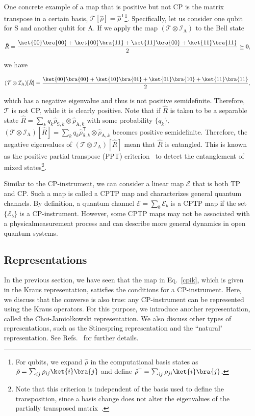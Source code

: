 \documentclass[preprint,pteplogo]{ptephy_v2}%
\numberwithin{equation}{section}
\theoremstyle{definition}
\newcommand{\ml}[1]{\mathcal{#1}}
\newcommand{\mr}[1]{\mathrm{#1}}
\newcommand{\aln}[1]{
\begin{align}
#1
\end{align}
}
\begin{document}
One concrete example of a map that is positive but not CP is the matrix transpose in a certain basis, $\ml{T}[\hat{\rho}]=\hat{\rho}^\mathsf{T}$\footnote{
For qubits, we expand $\hat{\rho}$ in the computational basis states as $\hat{\rho}=\sum_{ij} \rho_{ij}\ket{i}\bra{j}$ and define $\hat{\rho}^\mathsf{T}=\sum_{ij} \rho_{ji}\ket{i}\bra{j}$.
}.
Specifically, let us consider one qubit for S and another qubit for A.
If we apply the map $(\ml{T}\otimes \ml{I}_\mr{A})$ to the Bell state 
\aln{
\hat{R}=\frac{\ket{00}\bra{00}+\ket{00}\bra{11}+\ket{11}\bra{00}+\ket{11}\bra{11}}{2}\succeq 0,
}
we have
\aln{
(\ml{T}\otimes \ml{I}_\mr{A})[\hat{R}]=\frac{\ket{00}\bra{00}+\ket{10}\bra{01}+\ket{01}\bra{10}+\ket{11}\bra{11}}{2},
}
which has a negative eigenvalue and thus is not positive semidefinite.
Therefore, $\ml{T}$ is not CP, while it is clearly positive.
Note that if $\hat{R}$ is taken to be a separable state $\hat{R}=\sum_k q_k\hat{\rho}_{\mr{S},k}\otimes \hat{\rho}_{\mr{A},k}$ with some probability $\{q_k\}$, $(\ml{T}\otimes \ml{I}_\mr{A})[\hat{R}]=\sum_k q_k\hat{\rho}_{\mr{S},k}^\mathsf{T}\otimes \hat{\rho}_{\mr{A},k}$ becomes positive semidefinite.
Therefore, the negative eigenvalues of $(\ml{T}\otimes \ml{I}_\mr{A})[\hat{R}]$ mean that $\hat{R}$ is entangled. 
This is known as the positive partial transpose (PPT) criterion~\cite{peres1996separability, horodecki2001separability} to detect the entanglement of mixed states\footnote{
Note that this criterion is independent of the basis used to define the transposition, since a basis change does not alter the eigenvalues of the partially transposed matrix~\cite{wolf2012quantum}.
}.

Similar to the CP-instrument, we can consider a linear map $\ml{E}$ that is both TP and CP.
Such a map is called a CPTP map and characterizes general quantum channels.
By definition, a quantum channel $\ml{E}=\sum_b\ml{E}_b$ is a CPTP map if the set $\{\ml{E}_b\}$ is a CP-instrument. 
However, some CPTP maps may not be associated with a physicalmeasurement process and can describe more general dynamics in open quantum systems.


\subsection{Representations}
In the previous section, we have seen that the map in Eq.~\eqref{cpik}, which is given in the Kraus representation, satisfies the conditions for a CP-instrument. 
Here, we discuss that the converse is also true: any CP-instrument can be represented using the Kraus operators.
For this purpose, we introduce another representation, called the Choi-Jamiołkowski representation.
We also discuss other types of representations, such as the Stinespring representation and the ``natural" representation. 
See Refs.~\cite{wolf2012quantum, watrous2018theory} for further details.
\end{document}
